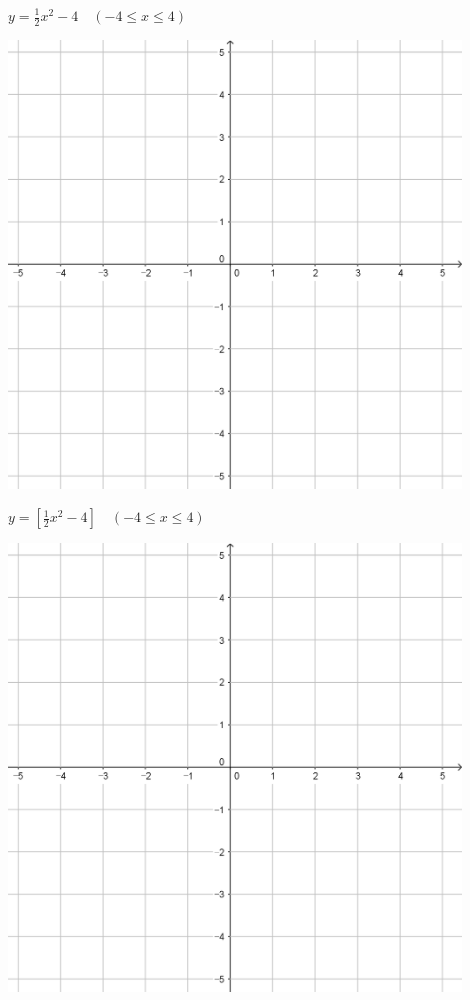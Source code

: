 \documentclass[a4paper]{oblivoir}
\begin{document}
\begin{minipage}{0.45\textwidth}\centering
\(y=\frac12x^2-4\quad(-4\le x\le4)\)
\par\bigskip\includegraphics[width=0.9\textwidth]{55}
\end{minipage}
\begin{minipage}{0.45\textwidth}\centering
\(y=[\frac12x^2-4]\quad(-4\le x\le4)\)
\par\bigskip\includegraphics[width=0.9\textwidth]{55}
\end{minipage}\bigskip\bigskip\par
\end{document}
